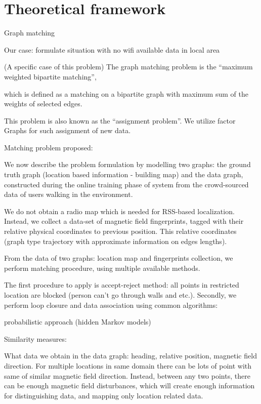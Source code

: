 \section{Theoretical framework}

Graph matching

Our case: formulate situation with no wifi available data in local area

(A specific case of this problem) The graph matching problem is the “maximum weighted bipartite matching”,

which is defined as a matching on a bipartite graph with maximum sum of the weights of selected edges.

This problem is also known as the “assignment problem”. We utilize factor Graphs for such assignment of new data.

Matching problem proposed:

We now describe the problem formulation by modelling two graphs: the ground truth graph (location based information - building map) and the data graph, constructed during the online training phase of system from the crowd-sourced data of users walking in the environment.

We do not obtain a radio map which is needed for RSS-based localization. Instead, we collect a data-set of magnetic field fingerprints, tagged with their relative physical coordinates to previous position. This relative coordinates (graph type trajectory with approximate information on edges lengths).

From the data of two graphs: location map and fingerprints collection, we perform matching procedure, using multiple available methods.

The first procedure to apply is accept-reject method: all points in restricted location are blocked (person can’t go through walls and etc.). Secondly, we perform loop closure and data association using common algorithms:


probabilistic approach (hidden Markov models)

Similarity measures:

What data we obtain in the data graph: heading, relative position, magnetic field direction. For multiple locations in same domain there can be lots of point with same of similar magnetic field direction. Instead, between any two points, there can be enough magnetic field disturbances, which will create enough information for distinguishing data, and mapping only location related data.

